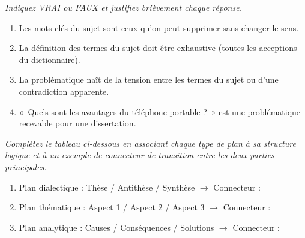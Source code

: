 \documentclass[11pt]{article}
\begin{document}
\begin{exercice}
\emph{Indiquez VRAI ou FAUX et justifiez brièvement chaque réponse.}
\begin{enumerate}
    \item Les mots-clés du sujet sont ceux qu'on peut supprimer sans changer le sens.
    \item La définition des termes du sujet doit être exhaustive (toutes les acceptions du dictionnaire).
    \item La problématique naît de la tension entre les termes du sujet ou d'une contradiction apparente.
    \item «~Quels sont les avantages du téléphone portable ?~» est une problématique recevable pour une dissertation.
\end{enumerate}
\end{exercice}

\begin{exercice}
\emph{Complétez le tableau ci-dessous en associant chaque type de plan à sa structure logique et à un exemple de connecteur de transition entre les deux parties principales.}
\begin{enumerate}
    \item Plan dialectique : Thèse / Antithèse / Synthèse $\rightarrow$ Connecteur : \dotfill
    \item Plan thématique : Aspect 1 / Aspect 2 / Aspect 3 $\rightarrow$ Connecteur : \dotfill
    \item Plan analytique : Causes / Conséquences / Solutions $\rightarrow$ Connecteur : \dotfill
\end{enumerate}
\end{exercice}
\end{document}
